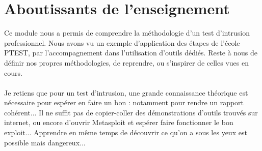 \section{Aboutissants de l'enseignement}

Ce module nous a permis de comprendre la méthodologie d'un test d'intrusion professionnel. Nous avons vu un exemple d'application des étapes de l'école PTEST, par l'accompagnement dans l'utilisation d'outils dédiés. Reste à nous de définir nos propres méthodologies, de reprendre, ou s'inspirer de celles vues en cours.
\\ \\
Je retiens que pour un test d'intrusion, une grande connaissance théorique est nécessaire pour espérer en faire un bon : notamment pour rendre un rapport cohérent... Il ne suffit pas de copier-coller des démonstrations d'outils trouvés sur internet, ou encore d'ouvrir Metasploit et espérer faire fonctionner le bon exploit... Apprendre en même temps de découvrir ce qu'on a sous les yeux est possible mais dangereux...